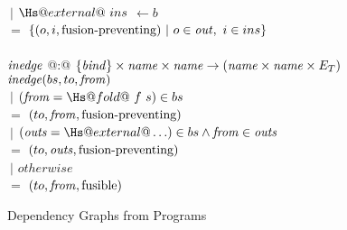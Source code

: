 \begin{figure}
\begin{tabbing}
\\[1ex]
   \> $~|$ \> $\Hs@external@~ins$ \> $\gets b$ \\
    \> $=$    \> $\{(o,i, \mbox{fusion-preventing}) ~|~ o \in \mathit{out},~ i \in ins \}$
\\
\\
$\mathit{inedge}$ @:@ $\{\mathit{bind}\} \times \mathit{name} \times \mathit{name} \to (\mathit{name} \times \mathit{name} \times E_T)$
\\
$\mathit{inedge}(bs,to,\mathit{from})$ \\
    \> $~|$ \> $(\from = \Hs@fold@~f~s) \in bs$     \\
    \> $=$ \> $(to, \mathit{from}, \mbox{fusion-preventing})$
\\[1ex]
    \> $~|$ \> $(\outs = \Hs@external@ \ldots) \in bs     \wedge \from \in \outs$     \\
    \> $=$ \> $(to, \mathit{outs}, \mbox{fusion-preventing})$
\\[1ex]
    \> $~|$ \> $otherwise$                      \\
    \> $=$ \> $(to, \mathit{from}, \mathrm{fusible})$
\end{tabbing}

\caption{Dependency Graphs from Programs}
\label{clustering:f:DependencyGraph}
\end{figure}

